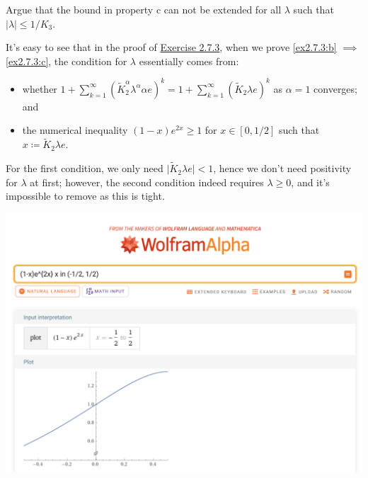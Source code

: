 \begin{problem*}[Exercise 2.7.4]\label{ex2.7.4}
	Argue that the bound in property c can not be extended for all \(\lambda \) such that \(\lvert \lambda \rvert \leq 1 / K_3\).
\end{problem*}
\begin{answer}
	It's easy to see that in the proof of \hyperref[ex2.7.3]{Exercise 2.7.3}, when we prove \autoref{ex2.7.3:b} \(\implies \) \autoref{ex2.7.3:c}, the condition for \(\lambda \) essentially comes from:
	\begin{itemize}
		\item whether \(1 + \sum_{k=1}^{\infty} (\widetilde{K} _2^\alpha \lambda ^\alpha \alpha e)^k = 1 + \sum_{k=1}^{\infty} (\widetilde{K} _2 \lambda e)^k\) as \(\alpha = 1\) converges; and
		\item the numerical inequality \((1 - x)e^{2x} \geq 1\) for \(x \in [0, 1 / 2]\) such that \(x \coloneqq \widetilde{K} _2 \lambda e\).
	\end{itemize}

	For the first condition, we only need \(\vert \widetilde{K} _2 \lambda e \vert < 1\), hence we don't need positivity for \(\lambda \) at first; however, the second condition indeed requires \(\lambda \geq 0\), and it's impossible to remove as this is tight.

	\begin{center}
		\includegraphics[width=\linewidth]{Figures/ex2.7.4.png}
	\end{center}
\end{answer}

